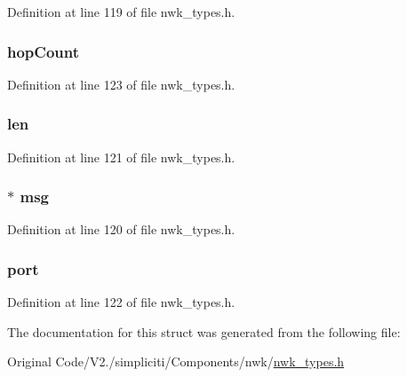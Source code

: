 \-Definition at line 119 of file nwk\-\_\-types.\-h.

\hypertarget{structioctlRawReceive__t_a95f97d42c2a291fbda2d2b4e82e12391}{
\subsubsection[{hop\-Count}]{ {\bf hop\-Count}}}\label{structioctlRawReceive__t_a95f97d42c2a291fbda2d2b4e82e12391}


\-Definition at line 123 of file nwk\-\_\-types.\-h.

\hypertarget{structioctlRawReceive__t_a5723e60ffd628510c699eddbce90be23}{
\subsubsection[{len}]{ {\bf len}}}\label{structioctlRawReceive__t_a5723e60ffd628510c699eddbce90be23}


\-Definition at line 121 of file nwk\-\_\-types.\-h.

\hypertarget{structioctlRawReceive__t_a8dd37bf01473e324d7c15a19fd211de9}{
\subsubsection[{msg}]{$\ast$ {\bf msg}}}\label{structioctlRawReceive__t_a8dd37bf01473e324d7c15a19fd211de9}


\-Definition at line 120 of file nwk\-\_\-types.\-h.

\hypertarget{structioctlRawReceive__t_a2fa54f9024782843172506fadbee2ac8}{
\subsubsection[{port}]{ {\bf port}}}\label{structioctlRawReceive__t_a2fa54f9024782843172506fadbee2ac8}


\-Definition at line 122 of file nwk\-\_\-types.\-h.



\-The documentation for this struct was generated from the following file\-:\begin{DoxyCompactItemize}
\item 
\-Original Code/\-V2./simpliciti/\-Components/nwk/\hyperlink{nwk__types_8h}{nwk\-\_\-types.\-h}\end{DoxyCompactItemize}
